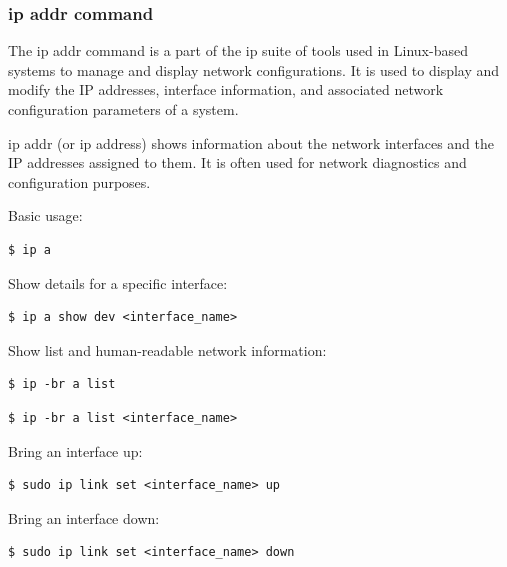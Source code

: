 \documentclass{article}
\newenvironment{codetemplate}[1][]{%
  \mybasecolorbox[#1]
  \itshape
}{%
  \endmybasecolorbox
}
\begin{document}
\subsubsection{ip addr command}
The ip addr command is a part of the ip suite of tools used in Linux-based systems to manage and display network configurations. It is used to display and modify the IP addresses, interface information, and associated network configuration parameters of a system.

ip addr (or ip address) shows information about the network interfaces and the IP addresses assigned to them. It is often used for network diagnostics and configuration purposes.

Basic usage:
\begin{codetemplate}{}
\begin{verbatim}
$ ip a
\end{verbatim}
\end{codetemplate}

Show details for a specific interface:
\begin{codetemplate}{}
\begin{verbatim}
$ ip a show dev <interface_name>
\end{verbatim}
\end{codetemplate}

Show list and human-readable network information:
\begin{codetemplate}{}
\begin{verbatim}
$ ip -br a list
\end{verbatim}
\end{codetemplate}

\begin{codetemplate}{}
\begin{verbatim}
$ ip -br a list <interface_name>
\end{verbatim}
\end{codetemplate}

Bring an interface up:
\begin{codetemplate}{}
\begin{verbatim}
$ sudo ip link set <interface_name> up
\end{verbatim}
\end{codetemplate}

Bring an interface down:
\begin{codetemplate}{}
\begin{verbatim}
$ sudo ip link set <interface_name> down
\end{verbatim}
\end{codetemplate}
\end{document}
